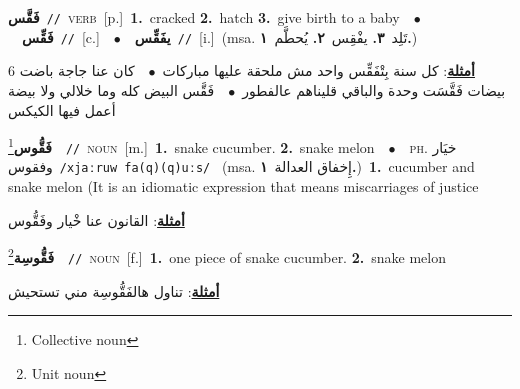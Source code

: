 \documentclass[10pt,a4paper,twoside]{article} %
\begin{document}
\begin{multicols}{2}
{\setlength\topsep{0pt}\textbf{\foreignlanguage{arabic}{فَقَّس}}\ {\color{gray}\texttt{//}\color{black}}\ \textsc{verb}\ [p.]\ \textbf{1.}~cracked  \textbf{2.}~hatch  \textbf{3.}~give birth to a baby\ \ $\bullet$\ \ \setlength\topsep{0pt}\textbf{\foreignlanguage{arabic}{فَقِّس}}\ {\color{gray}\texttt{//}\color{black}}\ [c.]\ \ $\bullet$\ \ \setlength\topsep{0pt}\textbf{\foreignlanguage{arabic}{يفَقِّس}}\ {\color{gray}\texttt{//}\color{black}}\ [i.]\ \color{gray}(msa. \foreignlanguage{arabic}{تَلِد}~\foreignlanguage{arabic}{\textbf{٣.}}  \foreignlanguage{arabic}{يفْقِس}~\foreignlanguage{arabic}{\textbf{٢.}}  \foreignlanguage{arabic}{يُحطَّم}~\foreignlanguage{arabic}{\textbf{١.}})\color{black}\  \begin{flushright}\color{gray}\foreignlanguage{arabic}{\textbf{\underline{\foreignlanguage{arabic}{أمثلة}}}: كل سنة بِتْفَقِّس واحد مش ملحقة عليها مباركات\ $\bullet$\ \  كان عنا جاجة باضت 6 بيضات فَقَّسَت وحدة والباقي قليناهم عالفطور\ $\bullet$\ \  فَقَّس البيض كله وما خلالي ولا بيضة أعمل فيها الكيكس}\end{flushright}\color{black}} \vspace{2mm}

{\setlength\topsep{0pt}\textbf{\foreignlanguage{arabic}{فَقُّوس}}\footnote{Collective noun}\ \ {\color{gray}\texttt{//}\color{black}}\ \textsc{noun}\ [m.]\ \textbf{1.}~snake cucumber.  \textbf{2.}~snake melon\ \ $\bullet$\ \ \textsc{ph.} \color{gray} \foreignlanguage{arabic}{خيَار وفقوس}\color{black}\ {\color{gray}\texttt{/{\sffamily xjaːruw fa(q)(q)uːs}/}\color{black}}\ \color{gray} (msa. \foreignlanguage{arabic}{إِخفاق العدالة}~\foreignlanguage{arabic}{\textbf{١.}})\color{black}\ \textbf{1.}~cucumber and snake melon (It is an idiomatic expression that means miscarriages of justice\  \begin{flushright}\color{gray}\foreignlanguage{arabic}{\textbf{\underline{\foreignlanguage{arabic}{أمثلة}}}: القانون عنا خْيار وفَقُّوس}\end{flushright}\color{black}} \vspace{2mm}

{\setlength\topsep{0pt}\textbf{\foreignlanguage{arabic}{فَقُّوسِة}}\footnote{Unit noun}\ \ {\color{gray}\texttt{//}\color{black}}\ \textsc{noun}\ [f.]\ \textbf{1.}~one piece of snake cucumber.  \textbf{2.}~snake melon\  \begin{flushright}\color{gray}\foreignlanguage{arabic}{\textbf{\underline{\foreignlanguage{arabic}{أمثلة}}}: تناول هالفَقُّوسِة مني تستحيش}\end{flushright}\color{black}} \vspace{2mm}


\end{multicols}
\end{document}
